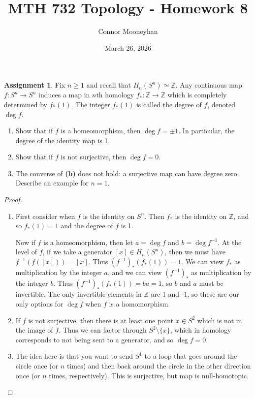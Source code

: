 \documentclass[12pt]{article}
\title{MTH 732 Topology - Homework 8}
\author{Connor Mooneyhan}
\date{March 26, 2026}
\theoremstyle{definition}
\newtheorem{ex}{Assignment}
\begin{document}
\maketitle

\begin{ex}
	Fix $n \geq 1$ and recall that $H_n(S^n) \simeq \mathbb{Z}$.
	Any continuous map $f : S^n \to S^n$ induces a map in $n$th homology $f_* : \mathbb{Z} \to \mathbb{Z}$ which is completely determined by $f_*(1)$.
	The integer $f_*(1)$ is called the degree of $f$, denoted $\deg f$.
	\begin{enumerate}[label=\textbf{(\alph*)}]
		\item Show that if $f$ is a homeomorphism, then $\deg f = \pm 1$.
		      In particular, the degree of the identity map is 1.
		\item Show that if $f$ is not surjective, then $\deg f = 0$.
		\item The converse of \textbf{(b)} does not hold: a surjective map can have degree zero.
		      Describe an example for $n = 1$.
	\end{enumerate}
\end{ex}
\begin{proof}\
	\begin{enumerate}[label=\textbf{(\alph*)}]
		\item First consider when $f$ is the identity on $S^n$.
		      Then $f_*$ is the identity on $\mathbb{Z}$, and so $f_*(1) = 1$ and the degree of $f$ is 1.

		      Now if $f$ is a homeomorphism, then let $a = \deg f$ and $b = \deg f^{-1}$.
		      At the level of $f$, if we take a generator $[x] \in H_n(S^n)$, then we must have $f^{-1}(f([x])) = [x]$.
		      Thus $(f^{-1})_*(f_*(1)) = 1$.
          We can view $f_*$ as multiplication by the integer $a$, and we can view $(f^{-1})_*$ as multiplication by the integer $b$.
          Thus $(f^{-1})_*(f_*(1)) = ba = 1$, so $b$ and $a$ must be invertible.
          The only invertible elements in $\mathbb{Z}$ are 1 and -1, so these are our only options for $\deg f$ when $f$ is a homomorphism.
		\item If $f$ is not surjective, then there is at least one point $x \in S^2$ which is not in the image of $f$.
      Thus we can factor through $S^2 \setminus \lbrace x \rbrace$, which in homology corresponds to not being sent to a generator, and so $\deg f = 0$.
    \item The idea here is that you want to send $S^1$ to a loop that goes around the circle once (or $n$ times) and then back around the circle in the other direction once (or $n$ times, respectively).
      This is surjective, but map is null-homotopic.
	\end{enumerate}
\end{proof}
\end{document}
